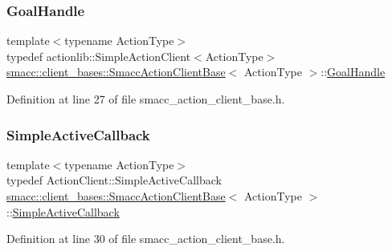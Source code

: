 \subsubsection{\texorpdfstring{Goal\+Handle}{GoalHandle}}
{\footnotesize\ttfamily template$<$typename Action\+Type$>$ \\
typedef actionlib\+::\+Simple\+Action\+Client$<$Action\+Type$>$ \hyperlink{classsmacc_1_1client__bases_1_1SmaccActionClientBase}{smacc\+::client\+\_\+bases\+::\+Smacc\+Action\+Client\+Base}$<$ Action\+Type $>$\+::\hyperlink{classsmacc_1_1client__bases_1_1SmaccActionClientBase_a43e1a844615218b95151d456eb32b835}{Goal\+Handle}}



Definition at line 27 of file smacc\+\_\+action\+\_\+client\+\_\+base.\+h.

\mbox{\label{classsmacc_1_1client__bases_1_1SmaccActionClientBase_acfd06f7c33418c03a340e74b00a4dddc}} 
\subsubsection{\texorpdfstring{Simple\+Active\+Callback}{SimpleActiveCallback}}
{\footnotesize\ttfamily template$<$typename Action\+Type$>$ \\
typedef Action\+Client\+::\+Simple\+Active\+Callback \hyperlink{classsmacc_1_1client__bases_1_1SmaccActionClientBase}{smacc\+::client\+\_\+bases\+::\+Smacc\+Action\+Client\+Base}$<$ Action\+Type $>$\+::\hyperlink{classsmacc_1_1client__bases_1_1SmaccActionClientBase_acfd06f7c33418c03a340e74b00a4dddc}{Simple\+Active\+Callback}}



Definition at line 30 of file smacc\+\_\+action\+\_\+client\+\_\+base.\+h.

\mbox{\label{classsmacc_1_1client__bases_1_1SmaccActionClientBase_a56eb842a85c65248fda43909b1aaeac1}} 
